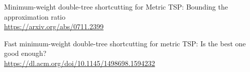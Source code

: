 \cleardoublepage
{}
{}
\begin{thebibliography}{99}

Minimum-weight double-tree shortcutting for Metric TSP: Bounding the approximation ratio\\ \url{https://arxiv.org/abs/0711.2399}

Fast minimum-weight double-tree shortcutting for metric TSP: Is the best one good enough?\\ \url{https://dl.acm.org/doi/10.1145/1498698.1594232}

\end{thebibliography}

